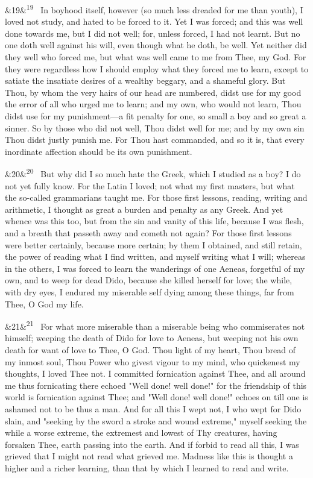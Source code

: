 \documentclass[12pt]{article}
\newcommand{\para}[1][]{\par\noindent\ifx&#1&\else\textsuperscript{\footnotesize #1}~\fi}
\begin{document}
\para[19] In boyhood itself, however (so much less dreaded for me than youth), I loved not study, and hated to be forced to it. Yet I was forced; and this was well done towards me, but I did not well; for, unless forced, I had not learnt. But no one doth well against his will, even though what he doth, be well. Yet neither did they well who forced me, but what was well came to me from Thee, my God. For they were regardless how I should employ what they forced me to learn, except to satiate the insatiate desires of a wealthy beggary, and a shameful glory. But Thou, by whom the very hairs of our head are numbered, didst use for my good the error of all who urged me to learn; and my own, who would not learn, Thou didst use for my punishment---a fit penalty for one, so small a boy and so great a sinner. So by those who did not well, Thou didst well for me; and by my own sin Thou didst justly punish me. For Thou hast commanded, and so it is, that every inordinate affection should be its own punishment.

\para[20] But why did I so much hate the Greek, which I studied as a boy? I do not yet fully know. For the Latin I loved; not what my first masters, but what the so-called grammarians taught me. For those first lessons, reading, writing and arithmetic, I thought as great a burden and penalty as any Greek. And yet whence was this too, but from the sin and vanity of this life, because I was flesh, and a breath that passeth away and cometh not again? For those first lessons were better certainly, because more certain; by them I obtained, and still retain, the power of reading what I find written, and myself writing what I will; whereas in the others, I was forced to learn the wanderings of one Aeneas, forgetful of my own, and to weep for dead Dido, because she killed herself for love; the while, with dry eyes, I endured my miserable self dying among these things, far from Thee, O God my life.

\para[21] For what more miserable than a miserable being who commiserates not himself; weeping the death of Dido for love to Aeneas, but weeping not his own death for want of love to Thee, O God. Thou light of my heart, Thou bread of my inmost soul, Thou Power who givest vigour to my mind, who quickenest my thoughts, I loved Thee not. I committed fornication against Thee, and all around me thus fornicating there echoed "Well done! well done!" for the friendship of this world is fornication against Thee; and "Well done! well done!" echoes on till one is ashamed not to be thus a man. And for all this I wept not, I who wept for Dido slain, and "seeking by the sword a stroke and wound extreme," myself seeking the while a worse extreme, the extremest and lowest of Thy creatures, having forsaken Thee, earth passing into the earth. And if forbid to read all this, I was grieved that I might not read what grieved me. Madness like this is thought a higher and a richer learning, than that by which I learned to read and write.
\end{document}
